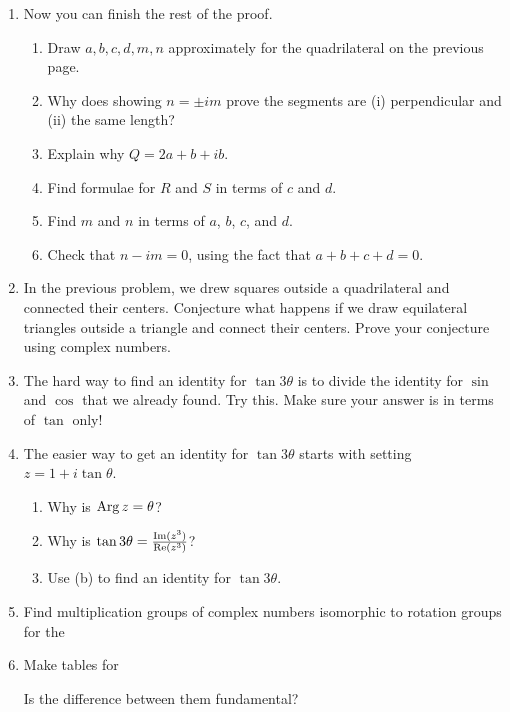 \documentclass[../gatm.tex]{subfiles}
\begin{document}

\begin{enumerate}
\setcounter{enumi}{\value{cg_problem_i}}
\item Now you can finish the rest of the proof.
\begin{enumerate}
\item Draw $a,b,c,d,m,n$ approximately for the quadrilateral on the previous page.
\item Why does showing $n=\pm im$ prove the segments are (i) perpendicular and (ii) the same length?
\item Explain why $Q=2a+b+ib$.
\item Find formulae for $R$ and $S$ in terms of $c$ and $d$.
\item Find $m$ and $n$ in terms of $a$, $b$, $c$, and $d$.
\item Check that $n-im=0$, using the fact that $a+b+c+d=0$.
\end{enumerate}
\item In the previous problem, we drew squares outside a quadrilateral and connected their centers. Conjecture what happens if we draw equilateral triangles outside a triangle and connect their centers. Prove your conjecture using complex numbers.
\item The hard way to find an identity for $\tan 3\theta$ is to divide the identity for $\sin$ and $\cos$ that we already found. Try this. Make sure your answer is in terms of $\tan$ only!
\item The easier way to get an identity for $\tan 3\theta$ starts with setting $z = 1 + i\tan\theta$.
\begin{enumerate}
\item Why is $\operatorname{Arg} z = \theta$?
\item Why is $\tan 3\theta = \frac{\operatorname{Im}(z^3)}{\operatorname{Re}(z^3)}$?
\item Use (b) to find an identity for $\tan 3\theta$.
\end{enumerate}
\item Find multiplication groups of complex numbers isomorphic to rotation groups for the
\begin{enumerate}
\end{enumerate}
\item Make tables for
\begin{enumerate}
\end{enumerate}
Is the difference between them fundamental?


\end{enumerate}
\end{document}
